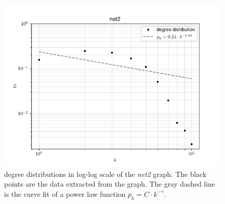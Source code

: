 \documentclass{article}
\newcommand{\scaleFreeFunction}{\ensuremath{p_k = C \cdot k^{-\gamma}}}
\newcommand{\netDescription}[1]{degree distributions in log-log scale of the \textit{net#1} graph. The black points are the data extracted from the graph. The gray dashed line is the curve fit of a power law function \scaleFreeFunction.}
\begin{document}
\begin{figure}[!ht]
    \centering
    \includegraphics[width=\textwidth]{../result/net2.png}
    \caption{\netDescription{2}}
    \label{figure:net2}
\end{figure}
\end{document}
